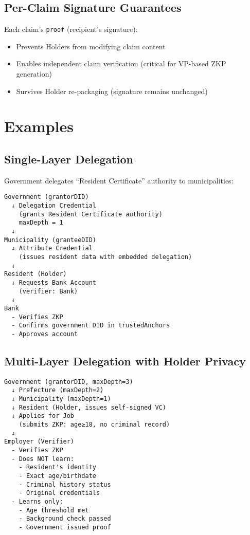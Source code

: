 \subsection{Per-Claim Signature Guarantees}

Each claim's \texttt{proof} (recipient's signature):

\begin{itemize}
  \item Prevents Holders from modifying claim content
  \item Enables independent claim verification (critical for VP-based ZKP generation)
  \item Survives Holder re-packaging (signature remains unchanged)
\end{itemize}

\section{Examples}

\subsection{Single-Layer Delegation}

Government delegates ``Resident Certificate'' authority to municipalities:

\begin{center}
\begin{verbatim}
Government (grantorDID)
  ↓ Delegation Credential
    (grants Resident Certificate authority)
    maxDepth = 1
  ↓
Municipality (granteeDID)
  ↓ Attribute Credential
    (issues resident data with embedded delegation)
  ↓
Resident (Holder)
  ↓ Requests Bank Account
    (verifier: Bank)
  ↓
Bank
  - Verifies ZKP
  - Confirms government DID in trustedAnchors
  - Approves account
\end{verbatim}
\end{center}

\subsection{Multi-Layer Delegation with Holder Privacy}

\begin{center}
\begin{verbatim}
Government (grantorDID, maxDepth=3)
  ↓ Prefecture (maxDepth=2)
  ↓ Municipality (maxDepth=1)
  ↓ Resident (Holder, issues self-signed VC)
  ↓ Applies for Job
    (submits ZKP: age≥18, no criminal record)
  ↓
Employer (Verifier)
  - Verifies ZKP
  - Does NOT learn:
    - Resident's identity
    - Exact age/birthdate
    - Criminal history status
    - Original credentials
  - Learns only:
    - Age threshold met
    - Background check passed
    - Government issued proof
\end{verbatim}
\end{center}

